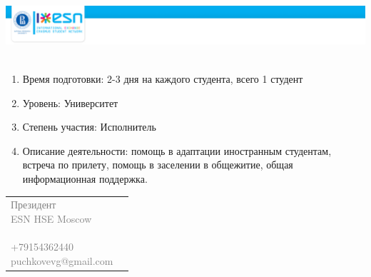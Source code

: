 \documentclass[a4paper,14pt]{extarticle}
\begin{document}
\hspace*{-1.5in}
\includegraphics[height=2.5cm]{top.png}

\bigskip







\bigskip

\begin{enumerate}[noitemsep]
\item Время подготовки: 2-3 дня на каждого студента, всего 1 студент
\item Уровень: Университет
\item Степень участия: Исполнитель
\item Описание деятельности: помощь в адаптации иностранным студентам, встреча
по прилету, помощь в заселении в общежитие, общая информационная поддержка.
\end{enumerate}

\vfill

\textcolor{gray}{
\begin{tabular}{p{7.63cm}p{7.63cm}}
    \parbox[b][][b]{7.63cm}{
        \small Президент \\
        ESN HSE Moscow \\
        \\
        +79154362440 \\
        puchkovevg@gmail.com \\
    }
    &
    \parbox[b][][b]{7.63cm}{} \\
\end{tabular}
}
\end{document}
